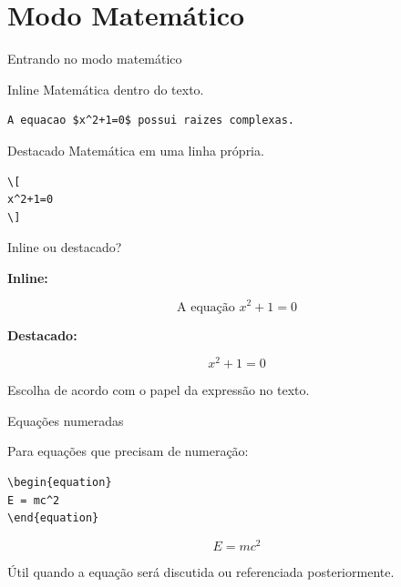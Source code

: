 \documentclass[aspectratio=169,xcolor=dvipsnames]{beamer}
\begin{document}
\section{Modo Matemático}

\begin{frame}[fragile]{Entrando no modo matemático}

    \begin{block}{Inline}
        Matemática dentro do texto.
    \end{block}

\begin{lstlisting}
A equacao $x^2+1=0$ possui raizes complexas.
\end{lstlisting}

    \begin{block}{Destacado}
        Matemática em uma linha própria.
    \end{block}

\begin{lstlisting}
\[
x^2+1=0
\]
\end{lstlisting}

\end{frame}

\begin{frame}{Inline ou destacado?}

    \textbf{Inline:}

    \[
        \text{A equação } x^2+1=0
    \]

    \vspace{0.4cm}

    \textbf{Destacado:}

    \[
        x^2+1=0
    \]

    \vspace{0.3cm}

    \begin{center}
        Escolha de acordo com o papel da expressão no texto.
    \end{center}

\end{frame}

\begin{frame}[fragile]{Equações numeradas}

    Para equações que precisam de numeração:

\begin{lstlisting}
\begin{equation}
E = mc^2
\end{equation}
\end{lstlisting}

    \begin{equation}
        E=mc^2
    \end{equation}

    \begin{center}
        Útil quando a equação será discutida ou referenciada posteriormente.
    \end{center}

\end{frame}
\end{document}
